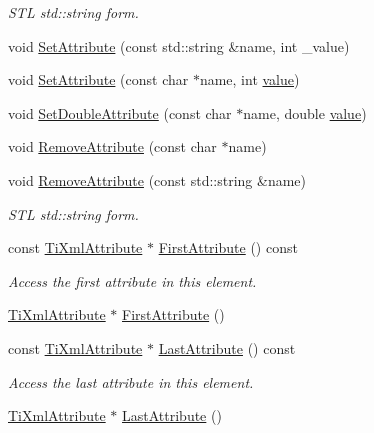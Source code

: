 \begin{DoxyCompactItemize}
\begin{DoxyCompactList}\small\item\em S\+TL std\+::string form. \end{DoxyCompactList}\item 
void \hyperlink{class_ti_xml_element_a6f18d54fbe25bbc527936ee65363b3c5}{Set\+Attribute} (const std\+::string \&name, int \+\_\+value)
\item 
void \hyperlink{class_ti_xml_element_ace6f4be75e373726d4774073d666d1a7}{Set\+Attribute} (const char $\ast$name, int \hyperlink{class_ti_xml_node_aead528b3cedc33c16a6c539872c7cc8b}{value})
\item 
void \hyperlink{class_ti_xml_element_a0d1dd975d75496778177e35abfe0ec0b}{Set\+Double\+Attribute} (const char $\ast$name, double \hyperlink{class_ti_xml_node_aead528b3cedc33c16a6c539872c7cc8b}{value})
\item 
void \hyperlink{class_ti_xml_element_a56979767deca794376b1dfa69a525b2a}{Remove\+Attribute} (const char $\ast$name)
\item 
void \hyperlink{class_ti_xml_element_a1afa6aea716511326a608e4c05df4f3a}{Remove\+Attribute} (const std\+::string \&name)
\begin{DoxyCompactList}\small\item\em S\+TL std\+::string form. \end{DoxyCompactList}\item 
const \hyperlink{class_ti_xml_attribute}{Ti\+Xml\+Attribute} $\ast$ \hyperlink{class_ti_xml_element_a003131b1bbf0b8054b11571c1b9a4d3a}{First\+Attribute} () const
\begin{DoxyCompactList}\small\item\em Access the first attribute in this element. \end{DoxyCompactList}\item 
\hyperlink{class_ti_xml_attribute}{Ti\+Xml\+Attribute} $\ast$ \hyperlink{class_ti_xml_element_a4b33780fc565d38d6b54f640e0cf1737}{First\+Attribute} ()
\item 
const \hyperlink{class_ti_xml_attribute}{Ti\+Xml\+Attribute} $\ast$ \hyperlink{class_ti_xml_element_a42939f55ed4cec5fc1daaecfded7ba16}{Last\+Attribute} () const
\begin{DoxyCompactList}\small\item\em Access the last attribute in this element. \end{DoxyCompactList}\item 
\hyperlink{class_ti_xml_attribute}{Ti\+Xml\+Attribute} $\ast$ \hyperlink{class_ti_xml_element_a222f81cf06155cd108f2a68d4d176004}{Last\+Attribute} ()

\end{DoxyCompactItemize}

